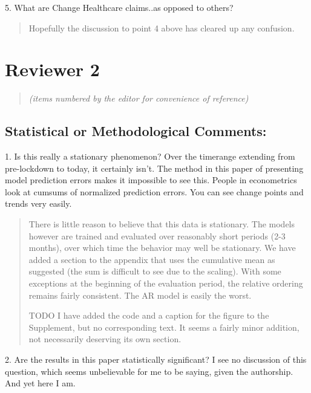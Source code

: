 \documentclass[11pt]{article}
\newenvironment{resp}{\begin{quote}\color{cobalt}}{\end{quote}}
\begin{document}
  5. What are Change Healthcare claims..as opposed to others?


\begin{resp}
  Hopefully the discussion to point 4 above has cleared up any confusion.
\end{resp}


\section*{Reviewer 2}
\begin{quote}
  \emph{(items numbered by the editor for convenience of reference)}
\end{quote}

\subsection*{Statistical or Methodological Comments:}
  
1. Is this really a stationary phenomenon? Over the timerange extending from
pre-lockdown to today, it certainly isn't. The method in this paper of
presenting model prediction errors makes it impossible to see this. People in
econometrics look at cumsums of normalized prediction errors. You can see change
points and trends very easily.

\begin{resp}
  There is little reason to believe that this data is stationary. The models
  however are trained and evaluated over reasonably short periods (2-3 months),
  over which time the behavior may well be stationary. We have added a section
  to the appendix that uses the cumulative mean as suggested (the sum is
  difficult to see due to the scaling). With some exceptions at the beginning of
  the evaluation period, the relative ordering remains fairly consistent. The AR
  model is easily the worst.

  TODO I have added the code and a caption for the figure to the Supplement, but
  no corresponding 
  text. It seems a fairly minor addition, not necessarily deserving its own
  section. 
\end{resp}

2. Are the results in this paper statistically significant? I see no discussion
of this question, which seems unbelievable for me to be saying, given the
authorship. And yet here I am.
\end{document}
